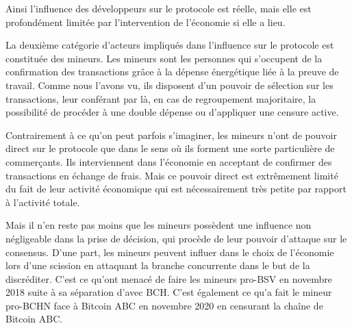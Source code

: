 Ainsi l'influence des développeurs sur le protocole est réelle, mais elle est profondément limitée par l'intervention de l'économie si elle a lieu.


La deuxième catégorie d'acteurs impliqués dans l'influence sur le protocole est constituée des mineurs. Les mineurs sont les personnes qui s'occupent de la confirmation des transactions grâce à la dépense énergétique liée à la preuve de travail. Comme nous l'avons vu, ils disposent d'un pouvoir de sélection sur les transactions, leur conférant par là, en cas de regroupement majoritaire, la possibilité de procéder à une double dépense ou d'appliquer une censure active.

Contrairement à ce qu'on peut parfois s'imaginer, les mineurs n'ont de pouvoir direct sur le protocole que dans le sens où ils forment une sorte particulière de commerçants. Ils interviennent dans l'économie en acceptant de confirmer des transactions en échange de frais. Mais ce pouvoir direct est extrêmement limité du fait de leur activité économique qui est nécessairement très petite par rapport à l'activité totale.

Mais il n'en reste pas moins que les mineurs possèdent une influence non négligeable dans la prise de décision, qui procède de leur pouvoir d'attaque sur le consensus. D'une part, les mineurs peuvent influer dans le choix de l'économie lors d'une scission en attaquant la branche concurrente dans le but de la discréditer. C'est ce qu'ont menacé de faire les mineurs pro-BSV en novembre 2018 suite à sa séparation d'avec BCH. C'est également ce qu'a fait le mineur pro-BCHN face à Bitcoin ABC en novembre 2020 en censurant la chaîne de Bitcoin ABC.

